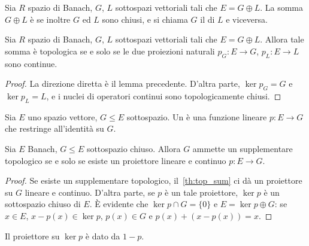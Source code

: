 \begin{definition}
	Sia $R$ spazio di Banach, $G$, $L$ sottospazi vettoriali tali che $E=G \oplus L$. La somma $G \oplus L$ è  se inoltre $G$ ed $L$ sono chiusi, e si chiama $G$ il  di $L$ e viceversa.
\end{definition}

\begin{theorem}
\label{th:top_sum}
	Sia $R$ spazio di Banach, $G$, $L$ sottospazi vettoriali tali che $E=G \oplus L$.
	Allora tale somma è topologica se e solo se le due proiezioni naturali $p_G : E \to G$, $p_L : E \to L$ sono continue.
\end{theorem}
\begin{proof}
	La direzione diretta è il lemma precedente. D'altra parte, $\ker p_G = G$ e $\ker p_L = L$, e i nuclei di operatori continui sono topologicamente chiusi.
\end{proof}

\begin{definition}
	Sia $E$ uno spazio vettore, $G \leq E$ sottospazio.
	Un  è una funzione lineare $p:E \to G$ che restringe all'identità su $G$.
\end{definition}

\begin{lemma}
	Sia $E$ Banach, $G \leq E$ sottospazio chiuso.
	Allora $G$ ammette un supplementare topologico se e solo se esiste un proiettore lineare e continuo $p:E \to G$.
\end{lemma}
\begin{proof}
	Se esiste un supplementare topologico, il~\ref{th:top_sum} ci dà un proiettore su $G$ lineare e continuo.
	D'altra parte, se $p$ è un tale proiettore, $\ker p$ è un sottospazio chiuso di $E$. È evidente che $\ker p \cap G = \{0\}$ e $E = \ker p \oplus G$: se $x \in E$, $x - p(x) \in \ker p$, $p(x) \in G$ e $p(x) +(x- p(x)) = x$.
\end{proof}

\begin{remark}
	Il proiettore su $\ker p$ è dato da $1-p$.
\end{remark}

